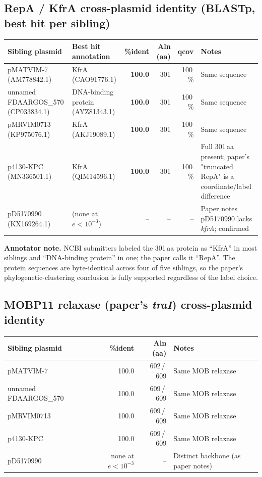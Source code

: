 \documentclass[11pt]{article}
\begin{document}
\subsection{RepA / KfrA cross-plasmid identity (BLASTp, best hit per sibling)}
\begin{center}
\begin{tabular}{lp{4cm}rrrp{3.2cm}}
\toprule
Sibling plasmid & Best hit annotation & \%ident & Aln (aa) & qcov & Notes \\
\midrule
pMATVIM-7 (AM778842.1)             & KfrA (CAO91776.1)                    & \textbf{100.0} & 301 & 100\,\% & Same sequence \\
unnamed FDAARGOS\_570 (CP033834.1) & DNA-binding protein (AYZ81343.1)     & \textbf{100.0} & 301 & 100\,\% & Same sequence \\
pMRVIM0713 (KP975076.1)            & KfrA (AKJ19089.1)                    & \textbf{100.0} & 301 & 100\,\% & Same sequence \\
p4130-KPC (MN336501.1)             & KfrA (QIM14596.1)                    & \textbf{100.0} & 301 & 100\,\% & Full 301\,aa present; paper's "truncated RepA" is a coordinate/label difference \\
pD5170990 (KX169264.1)             & (none at $e<10^{-3}$)                & --            & --  & --      & Paper notes pD5170990 lacks \textit{kfrA}; confirmed \\
\bottomrule
\end{tabular}
\end{center}

\textbf{Annotator note.} NCBI submitters labeled the 301\,aa protein as ``KfrA'' in
most siblings and ``DNA-binding protein'' in one; the paper calls it ``RepA''. The
protein sequences are byte-identical across four of five siblings, so the paper's
phylogenetic-clustering conclusion is fully supported regardless of the label choice.

\subsection{MOBP11 relaxase (paper's \textit{traI}) cross-plasmid identity}
\begin{center}
\begin{tabular}{lrrl}
\toprule
Sibling plasmid & \%ident & Aln (aa) & Notes \\
\midrule
pMATVIM-7               & 100.0 & 602\,/\,609 & Same MOB relaxase \\
unnamed FDAARGOS\_570   & 100.0 & 609\,/\,609 & Same MOB relaxase \\
pMRVIM0713              & 100.0 & 609\,/\,609 & Same MOB relaxase \\
p4130-KPC               & 100.0 & 609\,/\,609 & Same MOB relaxase \\
pD5170990               & none at $e<10^{-3}$ & -- & Distinct backbone (as paper notes) \\
\bottomrule
\end{tabular}
\end{center}
\end{document}

